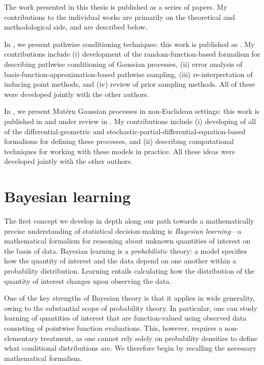 \documentclass[11pt]{book}
\begin{document}
The work presented in this thesis is published as a series of papers.
My contributions to the individual works are primarily on the theoretical and methodological side, and are described below.

In , we present pathwise conditioning techniques: this work is published as \textcite{wilson20,wilson21}.
My contributions include (i) development of the random-function-based formalism for describing pathwise conditioning of Gaussian processes, (ii) error analysis of basis-function-approximation-based pathwise sampling, (iii) re-interpretation of inducing point methods, and (iv) review of prior sampling methods.
All of these were developed jointly with the other authors. 

In , we present Matérn Gaussian processes in non-Euclidean settings: this work is published in \textcite{borovitskiy20,borovitskiy21} and under review in \textcite{hutchinson21,jacquier21}.
My contributions include (i) developing of all of the differential-geometric and stochastic-partial-differential-equation-based formalisms for defining these processes, and (ii) describing computational techniques for working with these models in practice.
All these ideas were developed jointly with the other authors.


\section{Bayesian learning}

The first concept we develop in depth along our path towards a mathematically precise understanding of statistical decision-making is \emph{Bayesian learning}---a mathematical formalism for reasoning about unknown quantities of interest on the basis of data.
Bayesian learning is a \emph{probabilistic} theory: a model specifies how the quantity of interest and the data depend on one another within a probability distribution.
Learning entails calculating how the distribution of the quantity of interest changes upon observing the data.

One of the key strengths of Bayesian theory is that it applies in wide generality, owing to the substantial scope of probability theory. 
In particular, one can study learning of quantities of interest that are function-valued using observed data consisting of pointwise function evaluations.
This, however, requires a non-elementary treatment, as one cannot rely solely on probability densities to define what conditional distributions are.
We therefore begin by recalling the necessary mathematical formalism.
\end{document}
